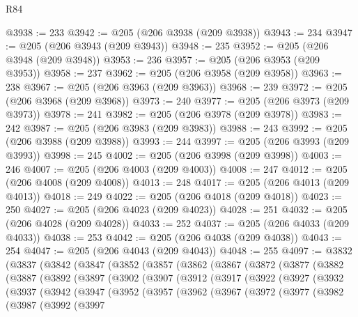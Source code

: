 \begin{lexlean}{R84}
\begin{coremodule}
@3938 := 233
@3942 := @205 (@206 @3938 (@209 @3938))
@3943 := 234
@3947 := @205 (@206 @3943 (@209 @3943))
@3948 := 235
@3952 := @205 (@206 @3948 (@209 @3948))
@3953 := 236
@3957 := @205 (@206 @3953 (@209 @3953))
@3958 := 237
@3962 := @205 (@206 @3958 (@209 @3958))
@3963 := 238
@3967 := @205 (@206 @3963 (@209 @3963))
@3968 := 239
@3972 := @205 (@206 @3968 (@209 @3968))
@3973 := 240
@3977 := @205 (@206 @3973 (@209 @3973))
@3978 := 241
@3982 := @205 (@206 @3978 (@209 @3978))
@3983 := 242
@3987 := @205 (@206 @3983 (@209 @3983))
@3988 := 243
@3992 := @205 (@206 @3988 (@209 @3988))
@3993 := 244
@3997 := @205 (@206 @3993 (@209 @3993))
@3998 := 245
@4002 := @205 (@206 @3998 (@209 @3998))
@4003 := 246
@4007 := @205 (@206 @4003 (@209 @4003))
@4008 := 247
@4012 := @205 (@206 @4008 (@209 @4008))
@4013 := 248
@4017 := @205 (@206 @4013 (@209 @4013))
@4018 := 249
@4022 := @205 (@206 @4018 (@209 @4018))
@4023 := 250
@4027 := @205 (@206 @4023 (@209 @4023))
@4028 := 251
@4032 := @205 (@206 @4028 (@209 @4028))
@4033 := 252
@4037 := @205 (@206 @4033 (@209 @4033))
@4038 := 253
@4042 := @205 (@206 @4038 (@209 @4038))
@4043 := 254
@4047 := @205 (@206 @4043 (@209 @4043))
@4048 := 255
@4097 := @3832
    (@3837
      (@3842
        (@3847
          (@3852
            (@3857
              (@3862
                (@3867
                  (@3872
                    (@3877
                      (@3882
                        (@3887
                          (@3892
                            (@3897
                              (@3902
                                (@3907
                                  (@3912
                                    (@3917
                                      (@3922
                                        (@3927
                                          (@3932
                                            (@3937
                                              (@3942
                                                (@3947
                                                  (@3952
                                                    (@3957
                                                      (@3962
                                                        (@3967
                                                          (@3972
                                                            (@3977
                                                              (@3982
                                                                (@3987
                                                                  (@3992
                                                                    (@3997

\end{coremodule}
\end{lexlean}
